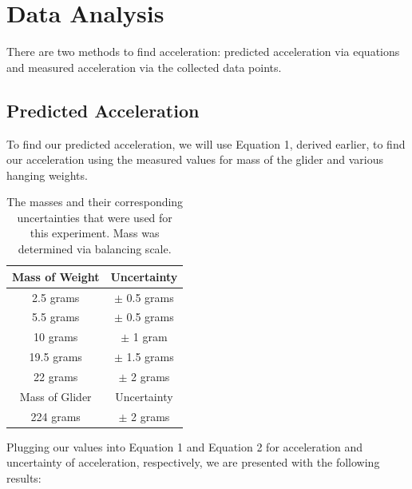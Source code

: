 \documentclass[titlepage]{article}
\begin{document}
\section{Data Analysis}
There are two methods to find acceleration: predicted acceleration via equations and measured acceleration via the collected data points.

\subsection{Predicted Acceleration}
To find our predicted acceleration, we will use Equation 1, derived earlier, to find our acceleration using the measured values for mass of the glider and various hanging weights.

\begin{table}[!htbp]
\renewcommand{\arraystretch}{1.3}
\centering
\begin{tabular}{c|c}
    \hline
    \hline
    Mass of Weight &  Uncertainty\\
    \hline
    \hline

    2.5 grams     &  $\pm$ 0.5 grams \\
    \hline

    5.5 grams    &   $\pm$ 0.5 grams \\
    \hline

    10 grams  &  $\pm$ 1 gram\\
    \hline

    19.5 grams  &  $\pm$ 1.5 grams\\
    \hline

    22 grams  &  $\pm$ 2 grams\\
    \hline
    \hline
    \hline
    Mass of Glider & Uncertainty\\
    \hline
    \hline

    224 grams & $\pm$ 2 grams\\
    \hline
\end{tabular}
\caption{The masses and their corresponding uncertainties that were used for this experiment. Mass was determined via balancing scale.}
\end{table}

\pagebreak

Plugging our values into Equation 1 and Equation 2 for acceleration and uncertainty of acceleration, respectively, we are presented with the following results:
\end{document}
